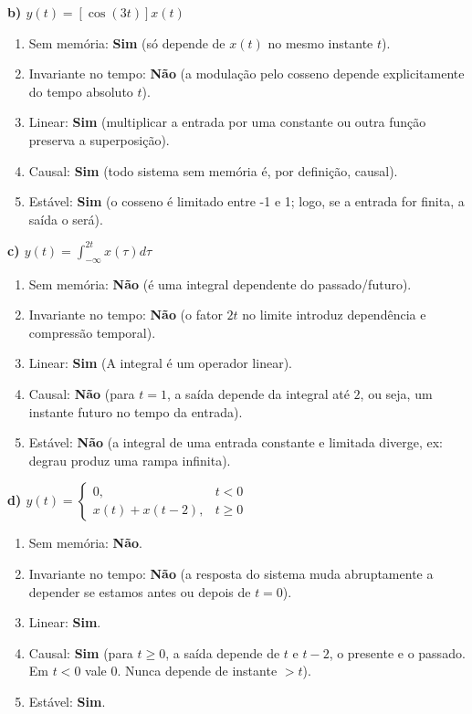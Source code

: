 \textbf{b) \(y(t) = [\cos(3t)]x(t)\)}

\begin{enumerate}
\def\labelenumi{\arabic{enumi}.}
\tightlist
\item
  Sem memória: \textbf{Sim} (só depende de \(x(t)\) no mesmo instante \(t\)).
\item
  Invariante no tempo: \textbf{Não} (a modulação pelo cosseno depende explicitamente do tempo absoluto \(t\)).
\item
  Linear: \textbf{Sim} (multiplicar a entrada por uma constante ou outra função preserva a superposição).
\item
  Causal: \textbf{Sim} (todo sistema sem memória é, por definição, causal).
\item
  Estável: \textbf{Sim} (o cosseno é limitado entre -1 e 1; logo, se a entrada for finita, a saída o será).
\end{enumerate}

\textbf{c) \(y(t) = \int_{-\infty}^{2t} x(\tau) d\tau\)}

\begin{enumerate}
\def\labelenumi{\arabic{enumi}.}
\tightlist
\item
  Sem memória: \textbf{Não} (é uma integral dependente do passado/futuro).
\item
  Invariante no tempo: \textbf{Não} (o fator \(2t\) no limite introduz dependência e compressão temporal).
\item
  Linear: \textbf{Sim} (A integral é um operador linear).
\item
  Causal: \textbf{Não} (para \(t=1\), a saída depende da integral até \(2\), ou seja, um instante futuro no tempo da entrada).
\item
  Estável: \textbf{Não} (a integral de uma entrada constante e limitada diverge, ex: degrau produz uma rampa infinita).
\end{enumerate}

\textbf{d) \(y(t) = \begin{cases} 0, & t < 0 \\ x(t) + x(t-2), & t \ge 0 \end{cases}\)}

\begin{enumerate}
\def\labelenumi{\arabic{enumi}.}
\tightlist
\item
  Sem memória: \textbf{Não}.
\item
  Invariante no tempo: \textbf{Não} (a resposta do sistema muda abruptamente a depender se estamos antes ou depois de \(t=0\)).
\item
  Linear: \textbf{Sim}.
\item
  Causal: \textbf{Sim} (para \(t \ge 0\), a saída depende de \(t\) e \(t-2\), o presente e o passado. Em \(t<0\) vale 0. Nunca depende de instante \(> t\)).
\item
  Estável: \textbf{Sim}.
\end{enumerate}

